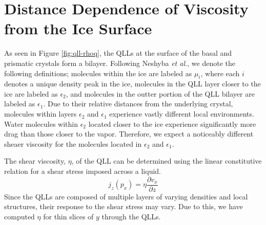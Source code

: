 \section{Distance Dependence of Viscosity from the Ice Surface}
As seen in Figure \ref{fig:qll-rhoq}, the QLLs at the surface of the
basal and prismatic crystals form a bilayer. Following Neshyba
\textit{et al.}, we denote the following definitions; molecules within
the ice are labeled as $\mu_{i}$, where each $i$ denotes a unique
density peak in the ice, molecules in the QLL layer closer to the ice
are labeled as $\epsilon_{2}$, and molecules in the outter portion of
the QLL bilayer are labeled as $\epsilon_{1}$.\cite{Neshyba2009} Due
to their relative distances from the underlying crystal, molecules
within layers $\epsilon_{2}$ and $\epsilon_{1}$ experience vastly
different local environments. Water molecules within $\epsilon_{2}$
located closer to the ice experience significantly more drag than
those closer to the vapor. Therefore, we expect a noticeably different
sheaer viscosity for the molecules located in $\epsilon_{2}$ and
$\epsilon_{1}$. 

The shear viscosity, $\eta$, of the QLL can be determined using the linear
constitutive relation for a shear stress imposed across a liquid.
\begin{equation}\label{eq:qll-visco}
j_z(p_x) = \eta \frac{\partial v_x}{\partial z}
\end{equation}
Since the QLLs are composed of multiple layers of varying densities
and local structures, their response to the shear stress may vary. Due
to this, we have computed $\eta$ for thin slices of $y$ through the
QLLs.



